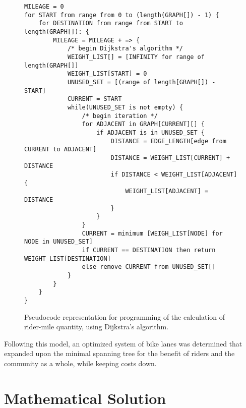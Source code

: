 \documentclass{article}
\begin{document}
\begin{figure}[!hbp] 
    \begin{Verbatim} 
MILEAGE = 0 
for START from range from 0 to (length(GRAPH[]) - 1) {
    for DESTINATION from range from START to length(GRAPH[]): {
        MILEAGE = MILEAGE + => {
            /* begin Dijkstra's algorithm */
            WEIGHT_LIST[] = [INFINITY for range of length(GRAPH[]] 
            WEIGHT_LIST[START] = 0 
            UNUSED_SET = [(range of length[GRAPH[]) - START] 
            CURRENT = START 
            while(UNUSED_SET is not empty) { 
                /* begin iteration */
                for ADJACENT in GRAPH[CURRENT][] {
                    if ADJACENT is in UNUSED_SET {
                        DISTANCE = EDGE_LENGTH[edge from CURRENT to ADJACENT]
                        DISTANCE = WEIGHT_LIST[CURRENT] + DISTANCE 
                        if DISTANCE < WEIGHT_LIST[ADJACENT] {
                            WEIGHT_LIST[ADJACENT] = DISTANCE 
                        }
                    }
                }
                CURRENT = minimum [WEIGH_LIST[NODE] for NODE in UNUSED_SET] 
                if CURRENT == DESTINATION then return WEIGHT_LIST[DESTINATION]
                else remove CURRENT from UNUSED_SET[]
            }
        }
    }
}
    \end{Verbatim} 
    \caption[Programming for rider-mile calculation]{Pseudocode representation for programming of the calculation of rider-mile quantity, using Dijkstra's algorithm.} 
    \label{code5} 
\end{figure} 

Following this model, an optimized system of bike lanes was determined that expanded upon the minimal spanning tree for the benefit of riders and the community as a whole, while keeping costs down.

\section{Mathematical Solution} 
\end{document}
